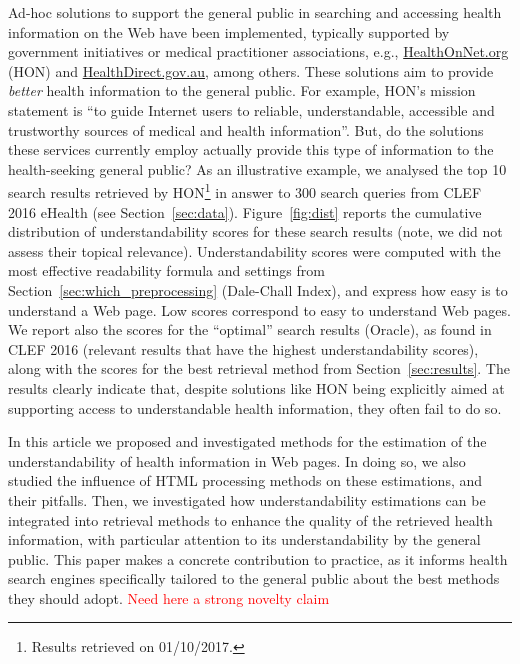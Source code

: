 Ad-hoc solutions to support the general public in searching and accessing health information on the Web have been implemented, typically supported by government initiatives or medical practitioner associations, e.g., \url{HealthOnNet.org} (HON) and \url{HealthDirect.gov.au}, among others. These solutions aim to provide \textit{better} health information to the general public. For example, HON's mission statement is ``to guide Internet users to reliable, understandable, accessible and trustworthy sources of medical and health information''. But, do the solutions these services currently employ actually provide this type of information to the health-seeking general public? As an illustrative example, we analysed the top 10 search results retrieved by HON\footnote{Results retrieved on 01/10/2017.} in answer to 300 search queries from CLEF 2016 eHealth (see Section~\ref{sec:data}). Figure~\ref{fig:dist} reports the cumulative distribution of understandability scores for these search results (note, we did not assess their topical relevance). Understandability scores were computed with the most effective readability formula and settings from Section~\ref{sec:which_preprocessing} (Dale-Chall Index), and express how easy is to understand a Web page. Low scores correspond to easy to understand Web pages. We report also the scores for the ``optimal'' search results (Oracle), as found in CLEF 2016 (relevant results that have the highest understandability scores), along with the scores for the best retrieval method from Section~\ref{sec:results}. The results clearly indicate that, despite solutions like HON being explicitly aimed at supporting access to understandable health information, they often fail to do so.

In this article we proposed and investigated methods for the estimation of the understandability of health information in Web pages. In doing so, we also studied the influence of HTML processing methods on these estimations, and their pitfalls. Then, we investigated how understandability estimations can be integrated into retrieval methods to enhance the quality of the retrieved health information, with particular attention to its understandability by the general public. This paper makes a concrete contribution to practice, as it informs health search engines specifically tailored to the general public about the best methods they should adopt. 
\textcolor{red}{Need here a strong novelty claim}

